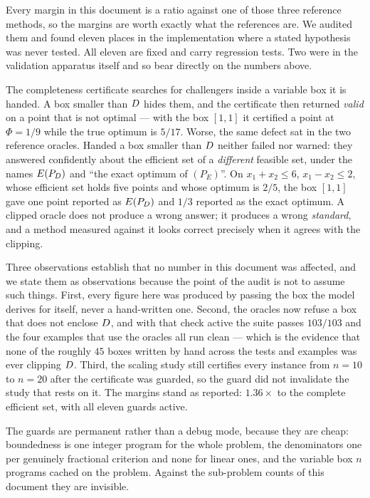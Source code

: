 \documentclass[11pt,a4paper]{article}
\begin{document}
Every margin in this document is a ratio against one of those three reference
methods, so the margins are worth exactly what the references are.  We audited
them and found eleven places in the implementation where a stated hypothesis
was never tested.  All eleven are fixed and carry regression tests.  Two were
in the validation apparatus itself and so bear directly on the numbers above.

The completeness certificate searches for challengers inside a variable box it
is handed.  A box smaller than $D$ hides them, and the certificate then
returned \emph{valid} on a point that is not optimal --- with the box $[1,1]$
it certified a point at $\Phi = 1/9$ while the true optimum is $5/17$.  Worse,
the same defect sat in the two reference oracles.  Handed a box smaller than
$D$ neither failed nor warned: they answered confidently about the
efficient set of a \emph{different} feasible set, under the names $E(P_{D})$ and
``the exact optimum of $(P_E)$''.  On $x_1 + x_2 \leqslant 6$,
$x_1 - x_2 \leqslant 2$, whose efficient set holds five points and whose
optimum is $2/5$, the box $[1,1]$ gave one point reported as $E(P_{D})$ and $1/3$
reported as the exact optimum.  A clipped oracle does not produce a wrong
answer; it produces a wrong \emph{standard}, and a method measured against it
looks correct precisely when it agrees with the clipping.

Three observations establish that no number in this document was affected, and
we state them as observations because the point of the audit is not to assume
such things.  First, every figure here was produced by passing the box the
model derives for itself, never a hand-written one.  Second, the oracles now
refuse a box that does not enclose $D$, and with that check active the
suite passes $103/103$ and the four examples that use the oracles all run
clean --- which is the evidence that none of the roughly $45$ boxes written by
hand across the tests and examples was ever clipping $D$.  Third, the
scaling study still certifies every instance from $n = 10$ to $n = 20$ after
the certificate was guarded, so the guard did not invalidate the study that
rests on it.  The margins stand as reported: $1.36\times$ to the complete
efficient set, with all eleven guards active.

The guards are permanent rather than a debug mode, because they are cheap:
boundedness is one integer program for the whole problem, the denominators one
per genuinely fractional criterion and none for linear ones, and the variable
box $n$ programs cached on the problem.  Against the sub-problem counts of this
document they are invisible.
\end{document}
